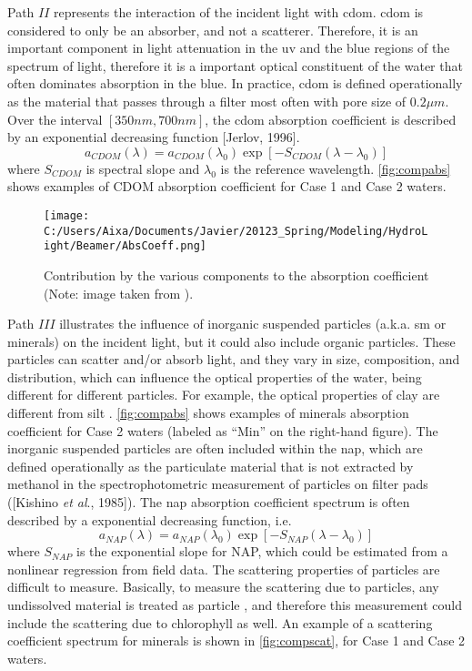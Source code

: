 Path $II$ represents the interaction of the incident light with \gls{cdom}. \gls{cdom} is considered to only be an absorber, and not a scatterer. Therefore, it is an important component in light attenuation in the \gls{uv} and the blue regions of the spectrum of light, therefore it is a important optical constituent of the water that often dominates absorption in the blue. In practice, \gls{cdom} is defined operationally as the material that passes through a filter most often with pore size of $0.2\mu m$. Over the interval $[350nm,700nm]$, the \gls{cdom} absorption coefficient is described by an exponential decreasing function [Jerlov, 1996].
\begin{equation}
  a_{CDOM}(\lambda) = a_{CDOM}(\lambda_0)\exp{\left[-S_{CDOM}(\lambda-\lambda_0)\right]}
\end{equation}
where $S_{CDOM}$ is spectral slope and $\lambda_0$ is the reference wavelength. \autoref{fig:compabs} shows examples of CDOM absorption coefficient for Case 1 and Case 2 waters.

\begin{figure}[htb]
\centering
      \texttt{[image: C:/Users/Aixa/Documents/Javier/20123\_Spring/Modeling/HydroLight/Beamer/AbsCoeff.png]}
      \caption{Contribution by the various components to the absorption coefficient (Note: image taken from \cite{Mobley:2001}).}
      \label{fig:compabs}
\end{figure}

Path $III$ illustrates the influence of inorganic suspended particles (a.k.a. \gls{sm} or minerals) on the incident light, but it could also include organic particles. These particles can scatter and/or absorb light, and they vary in size, composition, and distribution, which can influence the optical properties of the water, being different for different particles. For example, the optical properties of clay are different from silt \cite{Pahlevan:2012}. \autoref{fig:compabs} shows examples of minerals absorption coefficient for Case 2 waters (labeled as ``Min'' on the right-hand figure). The inorganic suspended particles are often included within the \gls{nap}, which are defined operationally as the particulate material that is not extracted by methanol in the spectrophotometric measurement of particles on filter pads ([Kishino {\it et al}., 1985]). The \gls{nap} absorption coefficient spectrum is often described by a exponential decreasing function, i.e.
\begin{equation}
  a_{NAP}(\lambda) = a_{NAP}(\lambda_0)\exp{\left[-S_{NAP}(\lambda-\lambda_0)\right]}
\end{equation}
where $S_{NAP}$ is the exponential slope for NAP, which could be estimated from a nonlinear regression from field data. The scattering properties of particles are difficult to measure. Basically, to measure the scattering due to particles, any undissolved material is treated as particle \cite{GeraceThesis}, and therefore this measurement could include the scattering due to chlorophyll as well. An example of a scattering coefficient spectrum for minerals is shown in \autoref{fig:compscat}, for Case 1 and Case 2 waters.

